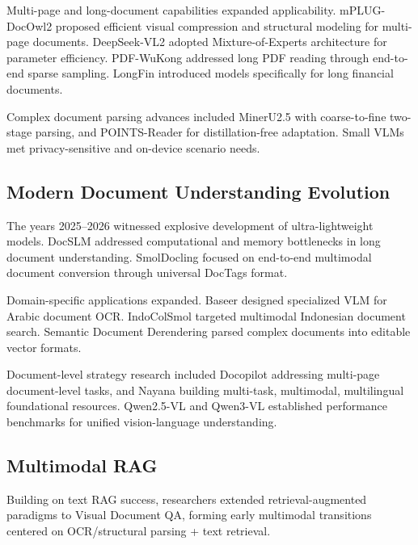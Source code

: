 Multi-page and long-document capabilities expanded applicability. mPLUG-DocOwl2 \cite{ye2024docowl2} proposed efficient visual compression and structural modeling for multi-page documents. DeepSeek-VL2 \cite{deepseek2024vl2} adopted Mixture-of-Experts architecture for parameter efficiency. PDF-WuKong \cite{li2024pdfwukong} addressed long PDF reading through end-to-end sparse sampling. LongFin \cite{chen2024longfin} introduced models specifically for long financial documents.

Complex document parsing advances included MinerU2.5 \cite{liu2025mineru25} with coarse-to-fine two-stage parsing, and POINTS-Reader \cite{wang2025pointsreader} for distillation-free adaptation. Small VLMs \cite{h2ovl2024mississippi} met privacy-sensitive and on-device scenario needs.

\subsection{Modern Document Understanding Evolution}

The years 2025--2026 witnessed explosive development of ultra-lightweight models. DocSLM \cite{wang2025docslm} addressed computational and memory bottlenecks in long document understanding. SmolDocling \cite{kim2025smoldocling} focused on end-to-end multimodal document conversion through universal DocTags format.

Domain-specific applications expanded. Baseer \cite{albaseer2025baseer} designed specialized VLM for Arabic document OCR. IndoColSmol \cite{rahman2025indocolsmol} targeted multimodal Indonesian document search. Semantic Document Derendering \cite{kim2025derendering} parsed complex documents into editable vector formats.

Document-level strategy research included Docopilot \cite{duan2025docopilot} addressing multi-page document-level tasks, and Nayana \cite{kolavi2025nayana} building multi-task, multimodal, multilingual foundational resources. Qwen2.5-VL \cite{bai2025qwen25vl} and Qwen3-VL \cite{bai2025qwen3vl} established performance benchmarks for unified vision-language understanding.

\subsection{Multimodal RAG}

Building on text RAG success, researchers extended retrieval-augmented paradigms to Visual Document QA, forming early multimodal transitions centered on OCR/structural parsing + text retrieval.

